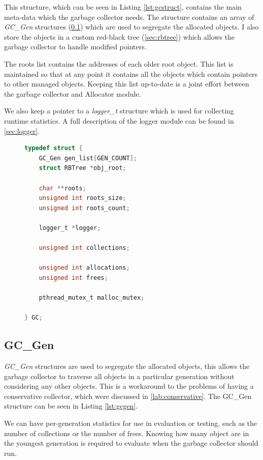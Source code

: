 \documentclass[../diss.tex]{subfiles}
\begin{document}
This structure, which can be seen in Listing \ref{lst:gcstruct}, contains the main meta-data which the garbage collector needs. The structure contains an array of \emph{GC\_Gen} structures (\cref{sec:gcgen}) which are used to segregate the allocated objects. I also store the objects in a custom red-black tree (\cref{sec:rbtree}) which allows the garbage collector to handle modified pointers.

The roots list contains the addresses of each older root object. This list is maintained so that at any point it contains all the objects which contain pointers to other managed objects. Keeping this list up-to-date is a joint effort between the garbage collector and Allocator module.

We also keep a pointer to a \emph{logger\_t} structure which is used for collecting runtime statistics. A full description of the logger module can be found in \cref{sec:logger}.

\begin{figure}
\begin{lstlisting}[language=C, caption=The GC structure with comments removed, label={lst:gcstruct}]
typedef struct {
    GC_Gen gen_list[GEN_COUNT];
    struct RBTree *obj_root;

    char **roots;
    unsigned int roots_size;
    unsigned int roots_count;

    logger_t *logger;

    unsigned int collections;

    unsigned int allocations;
    unsigned int frees;

    pthread_mutex_t malloc_mutex;

} GC;
\end{lstlisting}
\end{figure}

\subsection{GC\_Gen} \label{sec:gcgen}

\emph{GC\_Gen} structures are used to segregate the allocated objects, this allows the garbage collector to traverse all objects in a particular generation without considering any other objects. This is a workaround to the problems of having a conservative collector, which were discussed in \cref{lab:conservative}. The GC\_Gen structure can be seen in Listing \ref{lst:gcgen}. 

We can have per-generation statistics for use in evaluation or testing, such as the number of collections or the number of frees. Knowing how many object are in the youngest generation is required to evaluate when the garbage collector should run.
\end{document}
